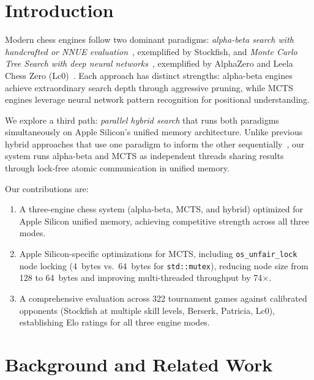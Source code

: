 \documentclass{svproc}
\begin{document}
\section{Introduction}
\label{sec:introduction}

Modern chess engines follow two dominant paradigms: \emph{alpha-beta search with handcrafted or NNUE evaluation}~\cite{stockfish}, exemplified by Stockfish, and \emph{Monte Carlo Tree Search with deep neural networks}~\cite{silver2018general}, exemplified by AlphaZero and Leela Chess Zero (Lc0)~\cite{lc0}. Each approach has distinct strengths: alpha-beta engines achieve extraordinary search depth through aggressive pruning, while MCTS engines leverage neural network pattern recognition for positional understanding.

We explore a third path: \emph{parallel hybrid search} that runs both paradigms simultaneously on Apple Silicon's unified memory architecture. Unlike previous hybrid approaches that use one paradigm to inform the other sequentially~\cite{baier2015mcts}, our system runs alpha-beta and MCTS as independent threads sharing results through lock-free atomic communication in unified memory.

Our contributions are:
\begin{enumerate}
    \item A three-engine chess system (alpha-beta, MCTS, and hybrid) optimized for Apple Silicon unified memory, achieving competitive strength across all three modes.
    \item Apple Silicon-specific optimizations for MCTS, including \texttt{os\_unfair\_lock} node locking (4~bytes vs.\ 64~bytes for \texttt{std::mutex}), reducing node size from 128 to 64~bytes and improving multi-threaded throughput by 74$\times$.
    \item A comprehensive evaluation across 322 tournament games against calibrated opponents (Stockfish at multiple skill levels, Berserk, Patricia, Lc0), establishing Elo ratings for all three engine modes.
\end{enumerate}


\section{Background and Related Work}
\label{sec:background}
\end{document}
